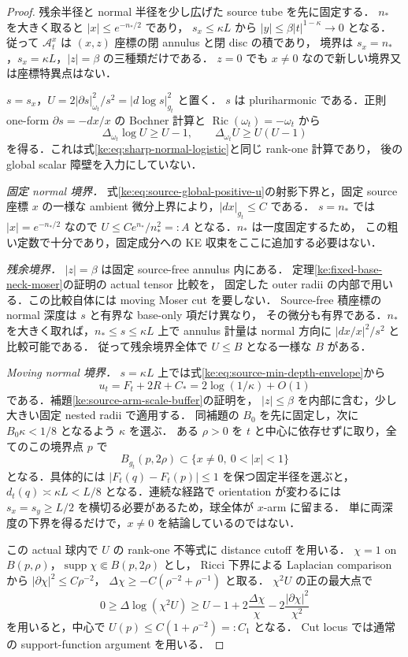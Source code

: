 \begin{proof}
残余半径と normal 半径を少し広げた source tube を先に固定する．
$n_*$ を大きく取ると $|x|\le e^{-n_*/2}$ であり，
$s_x\le\kappa L$ から $|y|\le\beta|t|^{1-\kappa}\to0$ となる．
従って $\mathcal A^x_t$ は $(x,z)$ 座標の閉 annulus と閉 disc の積であり，
境界は $s_x=n_*$，$s_x=\kappa L$，$|z|=\beta$ の三種類だけである．
$z=0$ でも $x\ne0$ なので新しい境界又は座標特異点はない．

$s=s_x$，$U=2|\partial s|_{\omega_t}^2/s^2=|d\log s|_{g_t}^2$ と置く．
$s$ は pluriharmonic である．正則 one-form $\partial s=-dx/x$ の
Bochner 計算と $\operatorname{Ric}(\omega_t)=-\omega_t$ から
\[
 \Delta_{\omega_t}\log U\ge U-1,
 \qquad \Delta_{\omega_t}U\ge U(U-1)
\]
を得る．これは式\eqref{ke:eq:sharp-normal-logistic}と同じ rank-one 計算であり，
後の global scalar 障壁を入力にしていない．

\emph{固定 normal 境界．}
式\eqref{ke:eq:source-global-positive-u}の射影下界と，固定 source 座標
$x$ の一様な ambient 微分上界により，$|dx|_{g_t}\le C$ である．
$s=n_*$ では $|x|=e^{-n_*/2}$ なので
$U\le C e^{n_*}/n_*^2=:A$ となる．$n_*$ は一度固定するため，
この粗い定数で十分であり，固定成分への KE 収束をここに追加する必要はない．

\emph{残余境界．}
$|z|=\beta$ は固定 source-free annulus 内にある．
定理\ref{ke:fixed-base-neck-moser}の証明の actual tensor 比較を，
固定した outer radii の内部で用いる．この比較自体には moving Moser cut を要しない．
Source-free 積座標の normal 深度は $s$ と有界な base-only 項だけ異なり，
その微分も有界である．$n_*$ を大きく取れば，$n_*\le s\le\kappa L$ 上で
annulus 計量は normal 方向に $|dx/x|^2/s^2$ と比較可能である．
従って残余境界全体で $U\le B$ となる一様な $B$ がある．

\emph{Moving normal 境界．}
$s=\kappa L$ 上では式\eqref{ke:eq:source-min-depth-envelope}から
\[
 u_t=F_t+2R+C_*=2\log(1/\kappa)+O(1)
\]
である．補題\ref{ke:source-arm-scale-buffer}の証明を，
$|z|\le\beta$ を内部に含む，少し大きい固定 nested radii で適用する．
同補題の $B_0$ を先に固定し，次に $B_0\kappa<1/8$ となるよう $\kappa$ を選ぶ．
ある $\rho>0$ を $t$ と中心に依存せずに取り，全てのこの境界点 $p$ で
\[
 B_{g_t}(p,2\rho)\subset\{x\ne0,\ 0<|x|<1\}
\]
となる．具体的には $|F_t(q)-F_t(p)|\le1$ を保つ固定半径を選ぶと，
$d_t(q)\asymp\kappa L<L/8$ となる．連続な経路で orientation が変わるには
$s_x=s_y\ge L/2$ を横切る必要があるため，球全体が $x$-arm に留まる．
単に両深度の下界を得るだけで，$x\ne0$ を結論しているのではない．

この actual 球内で $U$ の rank-one 不等式に distance cutoff を用いる．
$\chi=1$ on $B(p,\rho)$，$\operatorname{supp}\chi\Subset B(p,2\rho)$ とし，
Ricci 下界による Laplacian comparison から
$|\partial\chi|^2\le C\rho^{-2}$，
$\Delta\chi\ge-C(\rho^{-2}+\rho^{-1})$ と取る．
$\chi^2U$ の正の最大点で
\[
 0\ge\Delta\log(\chi^2U)
 \ge U-1+2\frac{\Delta\chi}{\chi}
               -2\frac{|\partial\chi|^2}{\chi^2}
\]
を用いると，中心で $U(p)\le C(1+\rho^{-2})=:C_1$ となる．
Cut locus では通常の support-function argument を用いる．


\end{proof}
